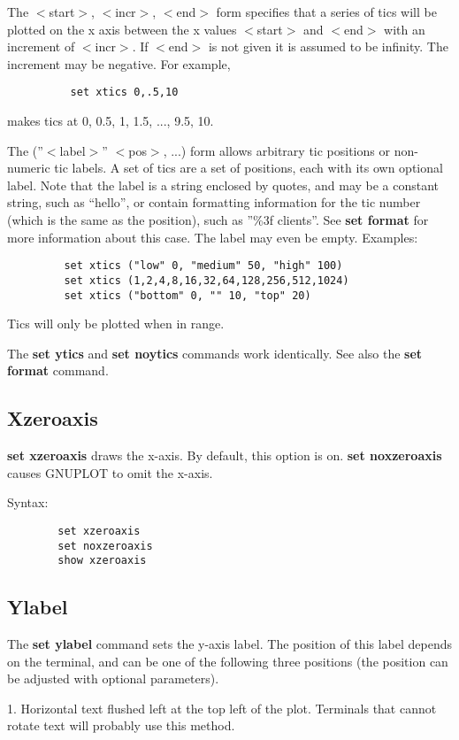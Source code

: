 The $<$start$>$, $<$incr$>$, $<$end$>$ form specifies that a series of tics will
be plotted on the x axis between the x values $<$start$>$ and $<$end$>$
with an increment of $<$incr$>$. If $<$end$>$ is not given it is assumed to be
infinity. The increment may be negative. For example,
\begin{verbatim}
          set xtics 0,.5,10
\end{verbatim}
makes tics at 0, 0.5, 1, 1.5, ..., 9.5, 10.

The (''$<$label$>$'' $<$pos$>$, ...) form allows arbitrary tic positions or
non-numeric tic labels. A set of tics are a set of positions, each
with its own optional label. Note that the label is a string enclosed
by quotes, and may be a constant string, such as ``hello'', or contain
formatting information for the tic number (which is the same as the
position), such as ''\%3f clients''. See {\bf set format} for more
information about this case. The label may even be empty.
Examples:
\begin{verbatim}
         set xtics ("low" 0, "medium" 50, "high" 100)
         set xtics (1,2,4,8,16,32,64,128,256,512,1024)
         set xtics ("bottom" 0, "" 10, "top" 20)
\end{verbatim}

Tics will only be plotted when in range.

The {\bf set ytics} and {\bf set noytics} commands work identically.
See also the {\bf set format} command.
\subsection{Xzeroaxis}
{\bf set xzeroaxis} draws the x-axis. By default, this option is on.
{\bf set noxzeroaxis} causes GNUPLOT to omit the x-axis.

Syntax:
\begin{verbatim}
        set xzeroaxis
        set noxzeroaxis
        show xzeroaxis
\end{verbatim}
\subsection{Ylabel}
The {\bf set ylabel} command sets the y-axis label.  The position of this
label depends on the terminal, and can be one of the following three
positions (the position can be adjusted with optional parameters).

1. Horizontal text flushed left at the top left of the plot.
Terminals that cannot rotate text will probably use this method.

